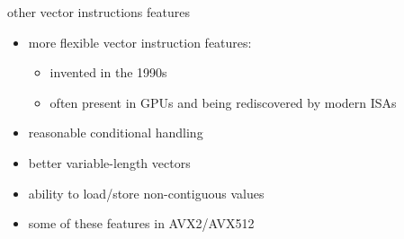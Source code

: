 

\begin{frame}{other vector instructions features}
    \begin{itemize}
    \item more flexible vector instruction features:
        \begin{itemize}
        \item invented in the 1990s
        \item often present in GPUs and being rediscovered by modern ISAs
        \end{itemize}
    \item reasonable conditional handling
    \item better variable-length vectors
    \item ability to load/store non-contiguous values
    \vspace{.5cm}
    \item some of these features in AVX2/AVX512
    \end{itemize}
\end{frame}

